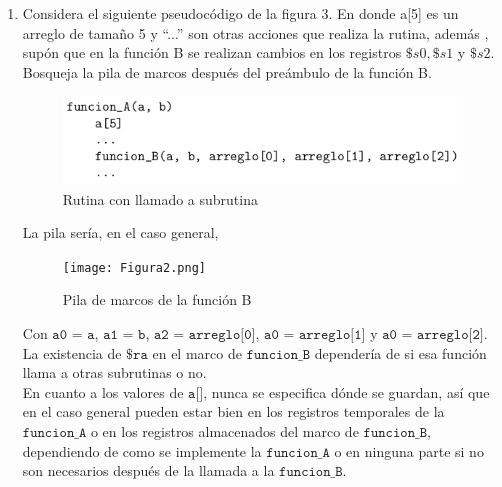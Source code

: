 \documentclass{article}
\begin{document}
\begin{enumerate}
{	
	}
	
		
	\item{
	Considera el siguiente pseudocódigo de la figura 3. En donde a[5] es un
	arreglo de tamaño 5 y “...” son otras acciones que realiza la rutina, además
	, supón que en la función B se realizan cambios en los registros $\$s0,
	\$s1$ y $\$s2$. Bosqueja la pila de marcos después del preámbulo de la 
	función B.
	
	\begin{figure}[H]
		\centering
		\includegraphics[scale=0.5]{Figura1.png}
		\caption{Rutina con llamado a subrutina}
	\end{figure}

	La pila sería, en el caso general,
	
	\begin{figure}[H]
		\centering
		\texttt{[image: Figura2.png]}
		\caption{Pila de marcos de la función B}
	\end{figure}
	}
	Con $\texttt{a0 = a}$, $\texttt{a1 = b}$, $\texttt{a2 = arreglo[0]}$,
	$\texttt{a0 = arreglo[1]}$ y $\texttt{a0 = arreglo[2]}$.\\
	La existencia de $\texttt{\$ra}$ en el marco de $\texttt{funcion\_B}$
	dependería de si esa función llama a otras subrutinas o no.\\
	En cuanto a los valores de $\texttt{a[]}$, nunca se especifica dónde se
	guardan, así que en el caso general pueden estar bien en los registros 
	temporales de la $\texttt{funcion\_A}$ o en los registros almacenados del
	marco de $\texttt{funcion\_B}$, dependiendo de como se implemente la 
	$\texttt{funcion\_A}$ o en ninguna parte si no son necesarios después de la
	llamada a la $\texttt{funcion\_B}$.
    \end{enumerate}
\end{document}
